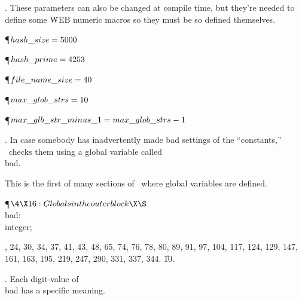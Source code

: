 .
These parameters can also be changed at compile time, but they're
needed to define some \.{WEB} numeric macros so they must be so
defined themselves.

\Y\P\D {}$\\{hash\_size}=5000$\par
\P\D {}$\\{hash\_prime}=4253$\par
\P\D {}$\\{file\_name\_size}=40$%
\par
\P\D {}$\\{max\_glob\_strs}=10$\par
\P\D {}$\\{max\_glb\_str\_minus\_1}=\\{max\_glob\_strs}-1$\par
\fi

.
In case somebody has inadvertently made bad settings of the ``constants,''
\BibTeX\ checks them using a global variable called \\{bad}.

This is the first of many sections of \BibTeX\ where global variables are
defined.

\Y\P$\4\X16:Globals in the outer block\X\S$\6
\4\\{bad}: \\{integer};\par
{}, 24, 30, 34, 37, 41, 43, 48, 65, 74, 76, 78, 80, 89, 91, 97, 104, 117,
124, 129, 147, 161, 163, 195, 219, 247, 290, 331, 337, 344.
\U10.\fi

.
Each digit-value of \\{bad} has a specific meaning.

